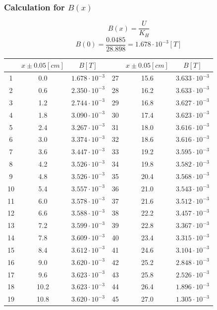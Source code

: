 \documentclass[12pt]{article}
\begin{document}
\subsubsection{Calculation for $B(x)$}
$$B(x)=\frac{U}{K_H}$$
$$B(0)=\frac{0.0485}{28.898}=1.678\cdot10^{-3}[T]$$
\begin{table}[H]
\centering
\begin{tabular}{|c|c|c||c|c|c|}
\hline
   &$x\pm0.05[cm]$&$B[T]$&  &$x\pm0.05[cm]$&$B[T]$  \\ \hline
1  & 0.0 &$1.678\cdot10^{-3}$  &27  &15.6  &$3.633\cdot10^{-3}$  \\ \hline
2  & 0.6 &$2.350\cdot10^{-3}$  &28  &16.2  &$3.633\cdot10^{-3}$  \\ \hline
3  & 1.2 &$2.744\cdot10^{-3}$  &29  &16.8  &$3.627\cdot10^{-3}$  \\ \hline
4  & 1.8 &$3.090\cdot10^{-3}$  &30  &17.4  &$3.623\cdot10^{-3}$  \\ \hline
5  & 2.4 &$3.267\cdot10^{-3}$  &31  &18.0  &$3.616\cdot10^{-3}$  \\ \hline
6  & 3.0 &$3.374\cdot10^{-3}$  &32  &18.6  &$3.616\cdot10^{-3}$  \\ \hline
7  & 3.6 &$3.447\cdot10^{-3}$  &33  &19.2  &$3.595\cdot10^{-3}$  \\ \hline
8  & 4.2 &$3.526\cdot10^{-3}$  &34  &19.8  &$3.582\cdot10^{-3}$  \\ \hline
9  & 4.8 &$3.526\cdot10^{-3}$ &35  &20.4  &$3.568\cdot10^{-3}$  \\ \hline
10 & 5.4 &$3.557\cdot10^{-3}$  &36  &21.0 &$3.543\cdot10^{-3}$  \\ \hline
11 & 6.0 &$3.578\cdot10^{-3}$  &37  &21.6  &$3.512\cdot10^{-3}$  \\ \hline
12 & 6.6 &$3.588\cdot10^{-3}$  &38  &22.2  &$3.457\cdot10^{-3}$  \\ \hline
13 & 7.2 &$3.599\cdot10^{-3}$  &39  &22.8 &$3.367\cdot10^{-3}$  \\ \hline
14 & 7.8 &$3.609\cdot10^{-3}$  &40  &23.4  &$3.315\cdot10^{-3}$  \\ \hline
15 & 8.4 &$3.612\cdot10^{-3}$  &41  &24.6  &$3.104\cdot10^{-3}$  \\ \hline
16 & 9.0 &$3.620\cdot10^{-3}$  &42  &25.2  &$2.848\cdot10^{-3}$  \\ \hline
17 & 9.6 &$3.623\cdot10^{-3}$  &43  &25.8  &$2.526\cdot10^{-3}$ \\ \hline
18 & 10.2 &$3.623\cdot10^{-3}$  &44 &26.4  &$1.896\cdot10^{-3}$  \\ \hline
19 & 10.8 &$3.620\cdot10^{-3}$ &45 &27.0  &$1.305\cdot10^{-3}$  \\ \hline

\end{tabular}
\end{table}
\end{document}
